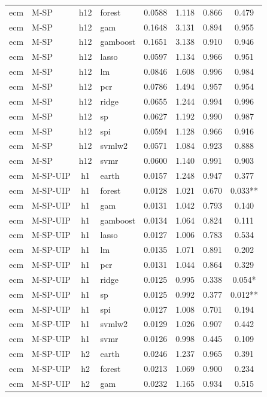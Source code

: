 \begin{ThreePartTable}
\begin{longtable}[t]{llclcccc}
ecm & M-SP & h12 & forest & 0.0588 & 1.118 & 0.866 & 0.479\\
ecm & M-SP & h12 & gam & 0.1648 & 3.131 & 0.894 & 0.955\\
ecm & M-SP & h12 & gamboost & 0.1651 & 3.138 & 0.910 & 0.946\\
ecm & M-SP & h12 & lasso & 0.0597 & 1.134 & 0.966 & 0.951\\
ecm & M-SP & h12 & lm & 0.0846 & 1.608 & 0.996 & 0.984\\
ecm & M-SP & h12 & pcr & 0.0786 & 1.494 & 0.957 & 0.954\\
ecm & M-SP & h12 & ridge & 0.0655 & 1.244 & 0.994 & 0.996\\
ecm & M-SP & h12 & sp & 0.0627 & 1.192 & 0.990 & 0.987\\
ecm & M-SP & h12 & spi & 0.0594 & 1.128 & 0.966 & 0.916\\
ecm & M-SP & h12 & svmlw2 & 0.0571 & 1.084 & 0.923 & 0.888\\
ecm & M-SP & h12 & svmr & 0.0600 & 1.140 & 0.991 & 0.903\\
\addlinespace
ecm & M-SP-UIP & h1 & earth & 0.0157 & 1.248 & 0.947 & 0.377\\
ecm & M-SP-UIP & h1 & forest & 0.0128 & 1.021 & 0.670 & 0.033**\\
ecm & M-SP-UIP & h1 & gam & 0.0131 & 1.042 & 0.793 & 0.140\\
ecm & M-SP-UIP & h1 & gamboost & 0.0134 & 1.064 & 0.824 & 0.111\\
ecm & M-SP-UIP & h1 & lasso & 0.0127 & 1.006 & 0.783 & 0.534\\
ecm & M-SP-UIP & h1 & lm & 0.0135 & 1.071 & 0.891 & 0.202\\
ecm & M-SP-UIP & h1 & pcr & 0.0131 & 1.044 & 0.864 & 0.329\\
ecm & M-SP-UIP & h1 & ridge & 0.0125 & 0.995 & 0.338 & 0.054*\\
ecm & M-SP-UIP & h1 & sp & 0.0125 & 0.992 & 0.377 & 0.012**\\
ecm & M-SP-UIP & h1 & spi & 0.0127 & 1.008 & 0.701 & 0.194\\
ecm & M-SP-UIP & h1 & svmlw2 & 0.0129 & 1.026 & 0.907 & 0.442\\
ecm & M-SP-UIP & h1 & svmr & 0.0126 & 0.998 & 0.445 & 0.109\\
\addlinespace
ecm & M-SP-UIP & h2 & earth & 0.0246 & 1.237 & 0.965 & 0.391\\
ecm & M-SP-UIP & h2 & forest & 0.0213 & 1.069 & 0.900 & 0.234\\
ecm & M-SP-UIP & h2 & gam & 0.0232 & 1.165 & 0.934 & 0.515\\

\end{longtable}
\end{ThreePartTable}
